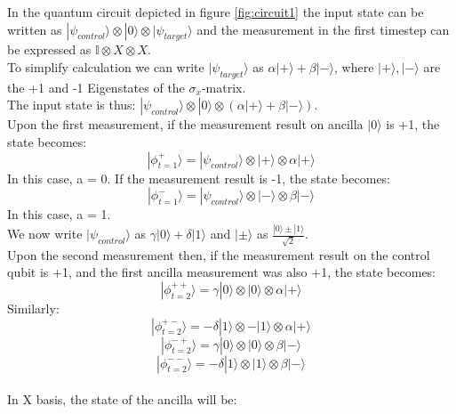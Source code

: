 In the quantum circuit depicted in figure \ref{fig:circuit1} the input
state can be written as $|\psi_{control}\rangle \otimes |0\rangle 
\otimes |\psi_{target}\rangle$ and the measurement in the first 
timestep can be expressed as $\mathbb{I}\otimes X \otimes X$.\\
To simplify calculation we can write $|\psi_{target}\rangle$ as
$\alpha |+\rangle + \beta |-\rangle$, where $|+\rangle,|-\rangle$ are
the +1 and -1 Eigenstates of the $\sigma_x$-matrix. \\
The input state is thus: 
$|\psi_{control}\rangle \otimes |0\rangle 
\otimes( \alpha |+\rangle + \beta |-\rangle)$.\\
Upon the first measurement, if the measurement result on ancilla $|0\rangle$
is +1, the state becomes:
\begin{equation}
	|\phi^{+}_{t=1}\rangle = |\psi_{control}\rangle \otimes |+\rangle \otimes \alpha |+\rangle
\end{equation}
In this case, a = 0.
If the measurement result is -1, the state becomes:
\begin{equation}
	|\phi^{-}_{t=1}\rangle = |\psi_{control}\rangle \otimes |-\rangle \otimes \beta|-\rangle
\end{equation}
In this case, a = 1.\\
We now write $|\psi_{control}\rangle$ as $\gamma |0\rangle + \delta |1\rangle$
and $|\pm\rangle$ as $\frac{|0\rangle\pm|1\rangle}{\sqrt{2}}$.\\
Upon the second measurement then, if the measurement result on 
the control qubit is +1, and the first ancilla measurement was also +1, the state becomes:\\
\begin{equation}
	|\phi^{++}_{t=2}\rangle = \gamma |0\rangle \otimes |0\rangle \otimes \alpha |+\rangle
\end{equation}
Similarly:
\begin{equation}
	|\phi^{+-}_{t=2}\rangle = -\delta |1\rangle \otimes -|1\rangle \otimes \alpha |+\rangle
\end{equation}
\begin{equation}
	|\phi^{-+}_{t=2}\rangle = \gamma|0\rangle \otimes |0\rangle \otimes \beta|-\rangle
\end{equation}
\begin{equation}
	|\phi^{--}_{t=2}\rangle = -\delta|1\rangle \otimes |1\rangle \otimes \beta|-\rangle
\end{equation}
\\
In X basis, the state of the ancilla will be:\\
